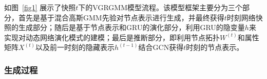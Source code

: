 如图~\ref{fig1} 展示了快照$t$下的VGRGMM模型流程。该模型框架主要分为三个部分，首先是基于混合高斯GMM先验对节点表示进行生成，并最终获得$t$时刻网络快照的生成部分；随后是基于节点表示和GRU的演化部分，利用GRU的隐变量$h$来实现对动态网络演化模式的建模；最后是推断部分，即利用节点拓扑$W^{(t)}$和属性矩阵$X^{(t)}$以及前一时刻的隐藏表示$h^{(t-1)}$结合GCN获得$t$时刻的节点表示。




\subsubsection{生成过程}


